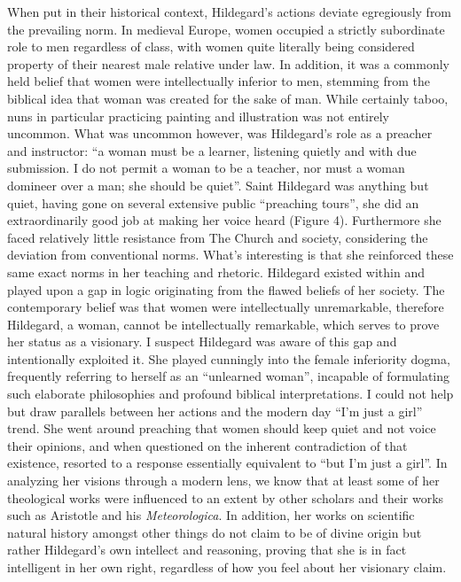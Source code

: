\documentclass{turabian-researchpaper}
\begin{document}
    When put in their historical context, Hildegard's actions deviate egregiously from the prevailing norm. In medieval Europe, women occupied a strictly subordinate role to men regardless of class, with women quite literally being considered property of their nearest male relative under law.\autocite{khan} In addition, it was a commonly held belief that women were intellectually inferior to men, stemming from the biblical idea that woman was created for the sake of man. While certainly taboo, nuns in particular practicing painting and illustration was not entirely uncommon. What was uncommon however, was Hildegard's role as a preacher and instructor: ``a woman must be a learner, listening quietly and with due submission. I do not permit a woman to be a teacher, nor must a woman domineer over a man; she should be quiet''.\autocite[52]{chadwick} Saint Hildegard was anything but quiet, having gone on several extensive public ``preaching tours'', she did an extraordinarily good job at making her voice heard (Figure 4). Furthermore she faced relatively little resistance from The Church and society, considering the deviation from conventional norms. What's interesting is that she reinforced these same exact norms in her teaching and rhetoric. Hildegard existed within and played upon a gap in logic originating from the flawed beliefs of her society. The contemporary belief was that women were intellectually unremarkable, therefore Hildegard, a woman, cannot be intellectually remarkable, which serves to prove her status as a visionary. I suspect Hildegard was aware of this gap and intentionally exploited it. She played cunningly into the female inferiority dogma, frequently referring to herself as an ``unlearned woman'', incapable of formulating such elaborate philosophies and profound biblical interpretations. I could not help but draw parallels between her actions and the modern day ``I'm just a girl'' trend. She went around preaching that women should keep quiet and not voice their opinions, and when questioned on the inherent contradiction of that existence, resorted to a response essentially equivalent to ``but I'm just a girl''. In analyzing her visions through a modern lens, we know that at least some of her theological works were influenced to an extent by other scholars and their works such as Aristotle and his \emph{Meteorologica}.\autocite[66]{singer} In addition, her works on scientific natural history amongst other things do not claim to be of divine origin but rather Hildegard's own intellect and reasoning, proving that she is in fact intelligent in her own right, regardless of how you feel about her visionary claim.
\end{document}
